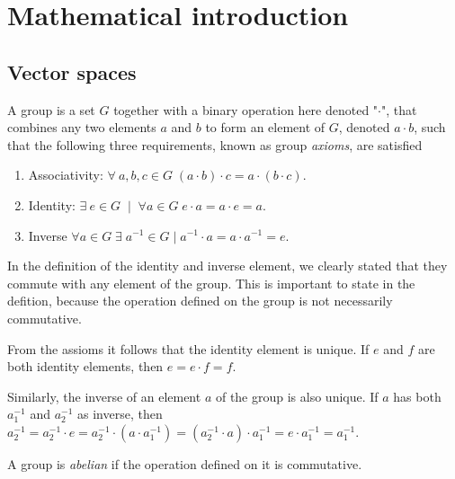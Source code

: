 \documentclass[11pt,fleqn]{book} %
\begin{document}
\chapter{Mathematical introduction}
\section{Vector spaces}
\begin{definition}[Group]
    A group is a set $G$ together with a binary operation here denoted "$\cdot$", that combines any two elements  $a$ and $b$ 
    to form an element of $G$, denoted $a\cdot b$, such that the following three requirements, known as group \textit{axioms}, 
    are satisfied
    \begin{enumerate}
        \item Associativity: $\forall\: a,b,c \in G\; (a\cdot b)\cdot c = a\cdot (b\cdot c)$.
        \item Identity: $\exists\: e \in G\;\mid\; \forall a\in G\; e\cdot a=a\cdot e=a$. 
        \item Inverse $\forall a\in G\;\exists\; a^{-1}\in G \mid a^{-1}\cdot a=a\cdot a^{-1}=e$.
    \end{enumerate}
\end{definition}

\begin{remark}
    In the definition of the identity and inverse element, we clearly stated that they commute with any element of the group. This is
    important to state in the defition, because the operation defined on the group is not necessarily commutative.    
\end{remark}

\begin{remark}
    From the assioms it follows that the identity element is unique. If $e$ and $f$ are both identity elements, then $e=e\cdot f=f$.
    
    Similarly, the inverse of an element $a$ of the group is also unique. If $a$ has both $a_1^{-1}$ and $a_2^{-1}$ as inverse, then
    $a_2^{-1} = a_2^{-1}\cdot e = a_2^{-1}\cdot(a\cdot a_1^{-1}) = (a_2^{-1}\cdot a)\cdot a_1^{-1}=e\cdot a_1^{-1}=a_1^{-1}$.
\end{remark}

\begin{definition}
    A group is \textit{abelian} if the operation defined on it is commutative.
\end{definition}
\end{document}
